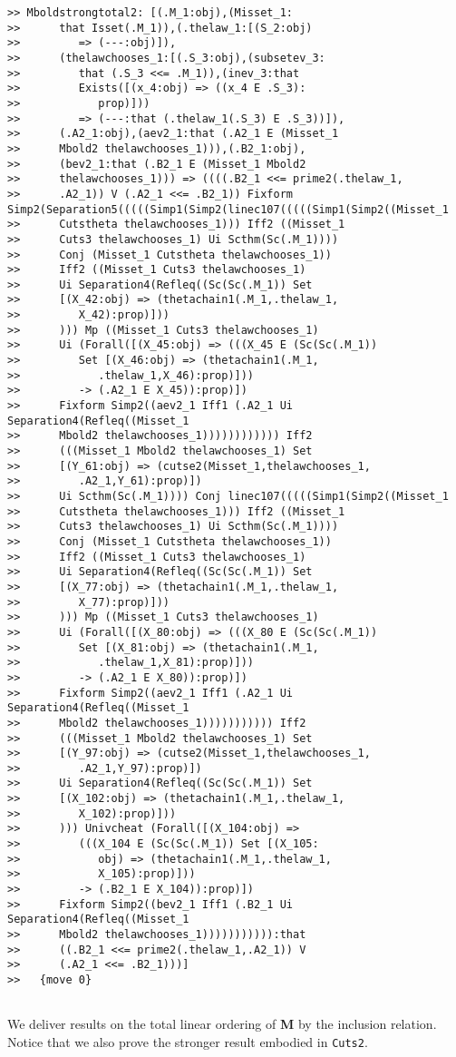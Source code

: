 \documentclass[12pt]{article}
\begin{document}
\begin{verbatim}
>> Mboldstrongtotal2: [(.M_1:obj),(Misset_1:
>>      that Isset(.M_1)),(.thelaw_1:[(S_2:obj)
>>         => (---:obj)]),
>>      (thelawchooses_1:[(.S_3:obj),(subsetev_3:
>>         that (.S_3 <<= .M_1)),(inev_3:that
>>         Exists([(x_4:obj) => ((x_4 E .S_3):
>>            prop)]))
>>         => (---:that (.thelaw_1(.S_3) E .S_3))]),
>>      (.A2_1:obj),(aev2_1:that (.A2_1 E (Misset_1
>>      Mbold2 thelawchooses_1))),(.B2_1:obj),
>>      (bev2_1:that (.B2_1 E (Misset_1 Mbold2
>>      thelawchooses_1))) => ((((.B2_1 <<= prime2(.thelaw_1,
>>      .A2_1)) V (.A2_1 <<= .B2_1)) Fixform Simp2(Separation5(((((Simp1(Simp2(linec107(((((Simp1(Simp2((Misset_1
>>      Cutstheta thelawchooses_1))) Iff2 ((Misset_1
>>      Cuts3 thelawchooses_1) Ui Scthm(Sc(.M_1))))
>>      Conj (Misset_1 Cutstheta thelawchooses_1))
>>      Iff2 ((Misset_1 Cuts3 thelawchooses_1)
>>      Ui Separation4(Refleq((Sc(Sc(.M_1)) Set
>>      [(X_42:obj) => (thetachain1(.M_1,.thelaw_1,
>>         X_42):prop)]))
>>      ))) Mp ((Misset_1 Cuts3 thelawchooses_1)
>>      Ui (Forall([(X_45:obj) => (((X_45 E (Sc(Sc(.M_1))
>>         Set [(X_46:obj) => (thetachain1(.M_1,
>>            .thelaw_1,X_46):prop)]))
>>         -> (.A2_1 E X_45)):prop)])
>>      Fixform Simp2((aev2_1 Iff1 (.A2_1 Ui Separation4(Refleq((Misset_1
>>      Mbold2 thelawchooses_1)))))))))))) Iff2
>>      (((Misset_1 Mbold2 thelawchooses_1) Set
>>      [(Y_61:obj) => (cutse2(Misset_1,thelawchooses_1,
>>         .A2_1,Y_61):prop)])
>>      Ui Scthm(Sc(.M_1)))) Conj linec107(((((Simp1(Simp2((Misset_1
>>      Cutstheta thelawchooses_1))) Iff2 ((Misset_1
>>      Cuts3 thelawchooses_1) Ui Scthm(Sc(.M_1))))
>>      Conj (Misset_1 Cutstheta thelawchooses_1))
>>      Iff2 ((Misset_1 Cuts3 thelawchooses_1)
>>      Ui Separation4(Refleq((Sc(Sc(.M_1)) Set
>>      [(X_77:obj) => (thetachain1(.M_1,.thelaw_1,
>>         X_77):prop)]))
>>      ))) Mp ((Misset_1 Cuts3 thelawchooses_1)
>>      Ui (Forall([(X_80:obj) => (((X_80 E (Sc(Sc(.M_1))
>>         Set [(X_81:obj) => (thetachain1(.M_1,
>>            .thelaw_1,X_81):prop)]))
>>         -> (.A2_1 E X_80)):prop)])
>>      Fixform Simp2((aev2_1 Iff1 (.A2_1 Ui Separation4(Refleq((Misset_1
>>      Mbold2 thelawchooses_1))))))))))) Iff2
>>      (((Misset_1 Mbold2 thelawchooses_1) Set
>>      [(Y_97:obj) => (cutse2(Misset_1,thelawchooses_1,
>>         .A2_1,Y_97):prop)])
>>      Ui Separation4(Refleq((Sc(Sc(.M_1)) Set
>>      [(X_102:obj) => (thetachain1(.M_1,.thelaw_1,
>>         X_102):prop)]))
>>      ))) Univcheat (Forall([(X_104:obj) =>
>>         (((X_104 E (Sc(Sc(.M_1)) Set [(X_105:
>>            obj) => (thetachain1(.M_1,.thelaw_1,
>>            X_105):prop)]))
>>         -> (.B2_1 E X_104)):prop)])
>>      Fixform Simp2((bev2_1 Iff1 (.B2_1 Ui Separation4(Refleq((Misset_1
>>      Mbold2 thelawchooses_1))))))))))):that
>>      ((.B2_1 <<= prime2(.thelaw_1,.A2_1)) V
>>      (.A2_1 <<= .B2_1)))]
>>   {move 0}


\end{verbatim}

We deliver results on the total linear ordering of {\bf M} by the inclusion relation.  Notice that we also prove the stronger result embodied in {\tt Cuts2}.
\end{document}

